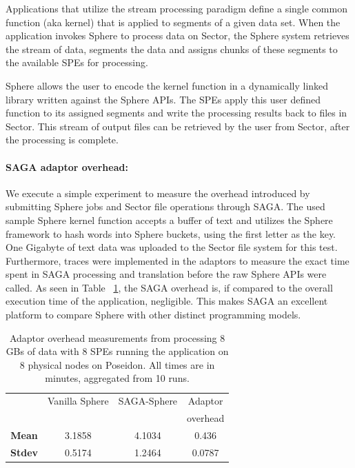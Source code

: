 \documentclass[3p,twocolumn]{elsarticle}
\begin{document}
Applications that utilize the stream processing paradigm define a
single common function (aka kernel) that is applied to segments of a
given data set.  When the application invokes Sphere to process data
on Sector, the Sphere system retrieves the stream of data, segments
the data and assigns chunks of these segments to the available SPEs
for processing.

Sphere allows the user to encode the kernel function in a dynamically
linked library written against the Sphere APIs.  The SPEs apply this
user defined function to its assigned segments and write the
processing results back to files in Sector.  This stream of output
files can be retrieved by the user from Sector, after the processing
is complete. 


\paragraph{SAGA adaptor overhead:}
\label{ssec:overhead}

We execute a simple experiment to measure the overhead introduced by
submitting Sphere jobs and Sector file operations through SAGA.  The
used sample Sphere kernel function accepts a buffer of text and
utilizes the Sphere framework to hash words into Sphere buckets, using
the first letter as the key. One Gigabyte of text data was uploaded to
the Sector file system for this test.  Furthermore, traces were
implemented in the adaptors to measure the exact time spent in SAGA
processing and translation before the raw Sphere APIs were called.  As
seen in Table ~\ref{tab:sphere_overhead}, the SAGA overhead is, if compared
to the overall execution time of the application, negligible.
This makes SAGA an excellent platform to compare Sphere with other distinct
programming models.

\begin{table}[h!]
  \footnotesize
  \begin{tabular}{cccc}
    \hline
    & Vanilla Sphere &  SAGA-Sphere & Adaptor \\
    &                &              & overhead \\
    \hline
    { {\bf Mean}} & 3.1858 & 4.1034 & 0.436 \\
    \hline 
    { {\bf Stdev}} & 0.5174 & 1.2464 & 0.0787 \\
    \hline \hline
  \end{tabular}
  \caption{Adaptor overhead measurements from processing 8 GBs of data with 8
  SPEs running the \wc application on 8 physical nodes on Poseidon.
  All times are in minutes, aggregated from 10 runs.\uppp
  \label{tab:sphere_overhead}}
\end{table}
\end{document}

